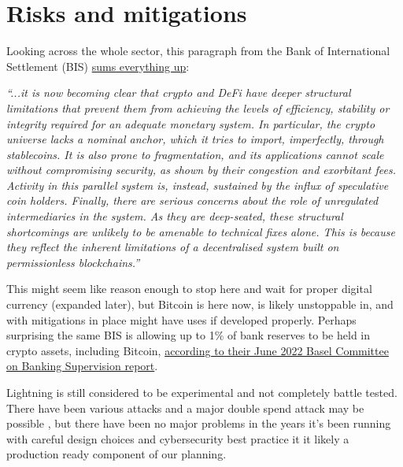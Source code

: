 \section{Risks and mitigations}
Looking across the whole sector, this paragraph from the Bank of International Settlement (BIS) \href{https://www.bis.org/publ/arpdf/ar2022e3.htm}{sums everything up}: \par
\textit{``...it is now becoming clear that crypto and DeFi have deeper structural limitations that prevent them from achieving the levels of efficiency, stability or integrity required for an adequate monetary system. In particular, the crypto universe lacks a nominal anchor, which it tries to import, imperfectly, through stablecoins. It is also prone to fragmentation, and its applications cannot scale without compromising security, as shown by their congestion and exorbitant fees. Activity in this parallel system is, instead, sustained by the influx of speculative coin holders. Finally, there are serious concerns about the role of unregulated intermediaries in the system. As they are deep-seated, these structural shortcomings are unlikely to be amenable to technical fixes alone. This is because they reflect the inherent limitations of a decentralised system built on permissionless blockchains.''}\par
This might seem like reason enough to  stop here and wait for proper digital currency (expanded later), but Bitcoin is here now, is likely unstoppable in, and with mitigations in place might have uses if developed properly. Perhaps surprising the same BIS is allowing up to 1\% of bank reserves to be held in crypto assets, including Bitcoin, \href{https://www.bis.org/bcbs/publ/d533.pdf}{according to their June 2022 Basel Committee on Banking Supervision report}. \par
Lightning is still considered to be experimental and not completely battle tested. There have been various attacks and a major double spend attack may be possible \cite{https://doi.org/10.48550/arxiv.2208.01908}, but there have been no major problems in the years it's been running with careful design choices and cybersecurity best practice it it likely a production ready component of our planning.
